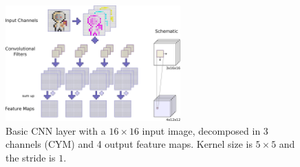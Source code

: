 \begin{figure}[!ht]
  \centering
    \includegraphics[width=0.6\textwidth]{./4_nn/figs/cnn_basics.eps}
  \caption{Basic CNN layer with a $16 \times 16$ input image, decomposed in 3 channels (CYM) and 4 output feature maps. Kernel size is $5 \times 5$ and the stride is $1$.}
  \label{fig:nn_theory_cnn_basics}
\end{figure}
\FloatBarrier
\noindent

